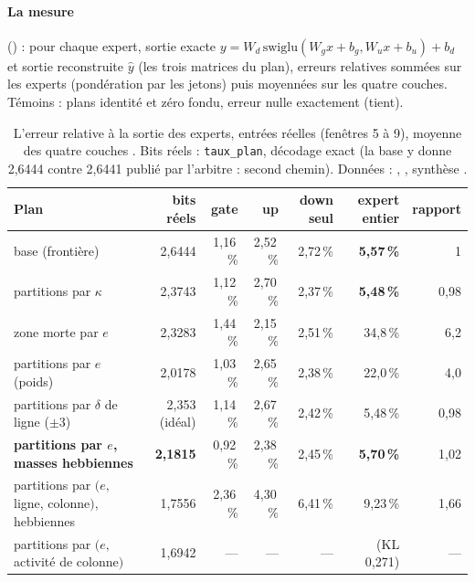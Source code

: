 \paragraph{La mesure} () : pour chaque expert, sortie exacte $y = W_d\,\mathrm{swiglu}(W_g x + b_g, W_u x + b_u) + b_d$ et sortie reconstruite $\hat y$ (les trois matrices du plan), erreurs relatives sommées sur les experts (pondération par les jetons) puis moyennées sur les quatre couches. Témoins : plans identité et zéro fondu, erreur nulle exactement (tient).

\begin{table}[tbp]
\centering\footnotesize\setlength{\tabcolsep}{3pt}
\begin{tabularx}{\linewidth}{@{}>{\raggedright\arraybackslash}X r r r r r r@{}}
\toprule
Plan & bits réels & gate & up & down seul & \textbf{expert entier} & rapport \\
\midrule
base (frontière) & 2,6444 & 1,16\,\% & 2,52\,\% & 2,72\,\% & \textbf{5,57\,\%} & 1 \\
partitions par $\kappa$ & 2,3743 & 1,12\,\% & 2,70\,\% & 2,37\,\% & \textbf{5,48\,\%} & 0,98 \\
zone morte par $e$ & 2,3283 & 1,44\,\% & 2,15\,\% & 2,51\,\% & 34,8\,\% & 6,2 \\
partitions par $e$ (poids) & 2,0178 & 1,03\,\% & 2,65\,\% & 2,38\,\% & 22,0\,\% & 4,0 \\
partitions par $\delta$ de ligne ($\pm3$) & 2,353 (idéal) & 1,14\,\% & 2,67\,\% & 2,42\,\% & 5,48\,\% & 0,98 \\
\textbf{partitions par $e$, masses hebbiennes} & \textbf{2,1815} & 0,92\,\% & 2,38\,\% & 2,45\,\% & \textbf{5,70\,\%} & 1,02 \\
partitions par $(e,$ ligne, colonne$)$, hebbiennes & 1,7556 & 2,36\,\% & 4,30\,\% & 6,41\,\% & 9,23\,\% & 1,66 \\
partitions par $(e,$ activité de colonne$)$ & 1,6942 & — & — & — & (KL 0,271) & — \\
\bottomrule
\end{tabularx}
\caption[L'erreur à la sortie des experts]{L'erreur relative à la sortie des experts, entrées réelles (fenêtres 5 à 9), moyenne des quatre couches \mes. Bits réels : \texttt{taux\_plan}, décodage exact (la base y donne 2,6444 contre 2,6441 publié par l'arbitre : second chemin). Données : , , synthèse .}
\label{t3pre:tab:sortie}
\end{table}

